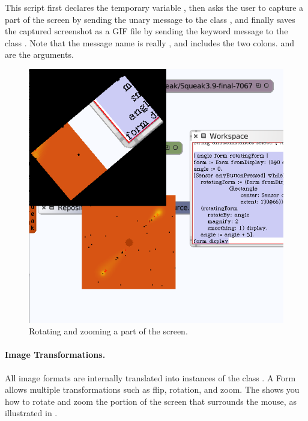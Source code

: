 \documentclass[a4paper,10pt,twoside]{book}
\begin{document}
\noindent
This script first declares the temporary variable , then asks the user to capture a part of the screen by sending the unary message  to the class , and finally saves the captured screenshot as a GIF file by sending the keyword message  to the class . Note that the message name is really , 
and includes the two colons.  and  are the arguments.

\begin{figure}
\begin{center}\includegraphics[scale=0.7]{rotated}\end{center}
\caption{Rotating and zooming a part of the screen.\label{fig:rotated}}
\end{figure}

\paragraph{Image Transformations.}
All image formats are internally translated into instances of the class . A Form allows multiple transformations such as flip, rotation, and zoom. The  shows you how to rotate and zoom 
the portion of the screen that surrounds the mouse, as illustrated in .
\end{document}
